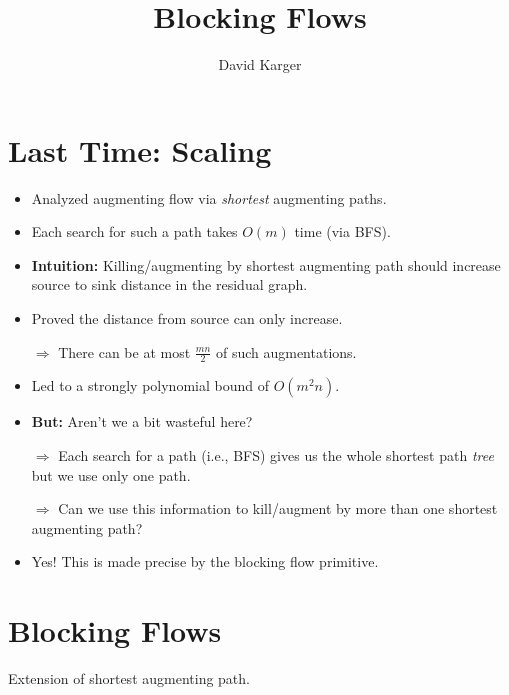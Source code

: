 \documentclass{article}
\title{Blocking Flows}
\author{David Karger}
\begin{document}
\section{Last Time: Scaling}

\begin{itemize}
\item Analyzed augmenting flow via {\em shortest} augmenting paths.
\item Each search for such a path takes $O(m)$ time (via BFS).
\item \textbf{Intuition:} Killing/augmenting by shortest augmenting path should increase source to sink distance in the residual graph.
\item Proved the distance from source can only increase.

$\Rightarrow$ There can be at most $\frac{mn}{2}$ of such augmentations. 
\item Led to a strongly polynomial bound of $O(m^2n)$.
\item \textbf{But:} Aren't we a bit wasteful here?

$\Rightarrow$ Each search for a path (i.e., BFS) gives us the whole shortest path {\em tree} but we use only one path. 

$\Rightarrow$ Can we use this information to kill/augment by more than one shortest augmenting path?

\item Yes! This is made precise by the blocking flow primitive.
\end{itemize}

\section{Blocking Flows} %

Extension of shortest augmenting path.\\
\end{document}
